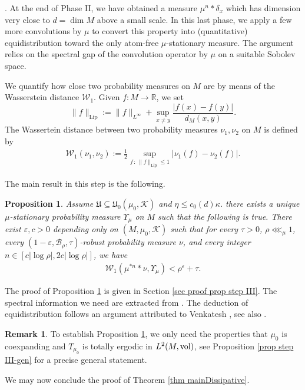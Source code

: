 \documentclass[11pt, leqno, fleqn]{amsart}
\def\cU{\mathfrak U}
\def\cW{\mathcal W}
\def\eps{\varepsilon}
\def\cB{          \mathcal B}
\def \R{{\mathbb R}}
\DeclareMathOperator{\Lip}{Lip}
\newcommand{\cK}{{\mathcal K}}
\newcommand{\aryst}{\begin{eqnarray*}}
\newcommand{\earyst}{\end{eqnarray*}}
\newtheorem{prop}[thm]{\bf Proposition}
\theoremstyle{definition}
\newtheorem{rema}[thm]{\bf Remark}
\theoremstyle{definition}
\def \vol{  {\rm vol} }
\begin{document}
   
  .  
  At the end of Phase II, we have obtained a measure $\mu^{n}*\delta_{x}$ which has dimension very close to $d=\dim M$ above a small scale. In this last phase, we apply a few more convolutions by $\mu$ to convert this property into (quantitative) equidistribution toward the only  atom-free  $\mu$-stationary measure. The argument relies on the spectral gap of the convolution operator by $\mu$ on a suitable Sobolev space. 
  
    

  
 
 
We quantify how close  two probability measures on $M$ are by  means of the Wasserstein distance  $\cW_1$. 
Given $f :M\rightarrow \R$, we set
$$\|f\|_{\Lip}:=  \|f\|_{L^{\infty}} + \sup_{x\neq y}\frac{|f(x)-f(y)|}{d_{M}(x,y)}. $$
The Wassertein distance between two probability measures $\nu_1, \nu_2$ on $M$ is  defined by
\aryst
\cW_1(\nu_1, \nu_2) := \frac{1}{2}\sup_{f\,:\, \|f\|_{\Lip}\leq 1} |\nu_{1}(f)-\nu_{2}(f)|.
\earyst
     
      The main result in this step is the following. 
    \begin{prop} \label{prop step III}  
    Assume   $\cU\subseteq \cU_{0}(\mu_{0},\cK)$ and  $ \eta\leq c_{0}(d)\kappa$. 
       there exists a  unique $\mu$-stationary probability  measure $\Upsilon_{\mu}$ on $M$   such that the following is true.  There exist $\eps, c > 0$ depending only on $(M,\mu_0, \cK)$ such that    for every $\tau > 0$, $\rho \lll_{\mu} 1$,  every $(1 - \eps, \cB_\rho, \tau)$-robust probability measure $\nu$, and every integer $n \in [c  | \log \rho|, 2c | \log \rho | ]$, we have 
  	\aryst
  	\cW_1(\mu^{* n} * \nu, \Upsilon_{\mu} ) < \rho^{\eps} + \tau.
  	\earyst
      \end{prop}
 
The proof of Proposition \ref{prop step III}  is  given in Section \ref{sec proof prop step III}. The spectral information we need are extracted from \cite{DD, T3, DDZ}. The deduction of equidistribution follows an argument attributed to Venkatesh \cite{Venkatesh}, see also \cite{KK}.

  
 \begin{rema}   To establish Proposition \ref{prop step III}, we only need the properties that $\mu_{0}$ is coexpanding and $T_{\mu_{0}}$ is totally ergodic in $L^2(M, \vol)$,  see  Proposition  \ref{prop step III-gen} for a precise general statement. 
\end{rema}

  We may now conclude the proof of Theorem \ref{thm mainDissipative}.
  
\end{document}
